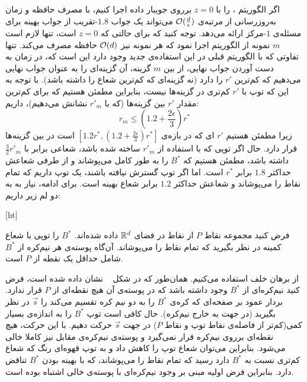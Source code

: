 اگر الگوریتم ، را با $z=0$ برروی جویبار داده اجرا کنیم، با مصرف حافظه‌ و زمان به‌روزرسانی از مرتبه‌ی $\mathcal{O}(\frac{d}{\epsilon})$ می‌تواند یک جواب $1.8$-تقریب از جواب بهینه برای مسئله‌ی $1$-مرکز ارائه می‌دهد. توجه کنید که برای حالتی که $z=0$ است، تنها لازم است $m$ نمونه از الگوریتم اجرا نمود که هر نمونه نیز $\mathcal{O}(d)$ حافظه مصرف می‌کند. تنها تفاوتی که با الگوریتم قبلی در این استفاده‌ی جدید وجود دارد این است که، در زمان به‌ دست آوردن جواب نهایی، از بین $m$ گزینه، آن گزینه‌ای را به عنوان جواب نهایی می‌دهیم که کم‌ترین $r'$ را دارد (نه گزینه‌ای که کم‌ترین  شعاع را داشته باشد). با توجه به این که توپ با $r'$ کم‌تری در گزینه‌ها نیست، بنابراین مطمئن هستیم که برای کم‌ترین مقدار $r'$ بین گزینه‌ها (که با $r'_m$ نشانش می‌دهیم)، داریم:
$$r_m \leq (1.2 + \frac{2\epsilon}{3})r^*$$
زیرا مطمئن هستیم $r'$ ای که در بازه‌ی $[1.2r^*, (1.2 + \frac{2\epsilon}{3})r^*]$ است در بین گزینه‌ها قرار دارد. حال اگر توپی که با استفاده از $r'_m$ ساخته شده باشد، شعاعی برابر با $\frac{3}{2}r'_m$ داشته باشد، مطمئن هستیم که $B^*$ را به طور کامل می‌پوشاند و از طرفی شعاعش حداکثر $1.8$ برابر $r^*$ است. اما اگر توپ گسترش نیافته باشند، یک توپ داریم که تمام نقاط را می‌پوشاند و شعاعش حداکثر $1.2$ برابر شعاع بهینه است. برای ادامه‌، نیاز به به دو لم زیر داریم:


[ht]


فرض کنید مجموعه نقاط $P$ از نقاط در فضای $\mathbb{R}^d$ داده شده‌اند. $B^*$ را توپی با شعاع کمینه در نظر بگیرید که تمام نقاط را می‌پوشاند. آن‌گاه پوسته‌ی هر نیم‌‌کره از $B^*$ شامل حداقل یک نقطه از $P$ است.


از برهان خلف استفاده می‌کنیم. همان‌طور که در شکل ~ نشان داده شده است، فرض کنید نیم‌کره‌ای از $B^*$ وجود داشته باشد که در پوسته‌ی آن هیچ نقطه‌ای از‌ $P$ قرار ندارد. بردار عمود بر صفحه‌ای که کره‌ی $B^*$ را به دو نیم کره تقسیم می‌کند را $\vec{s}$ در نظر بگیرید (در جهت به خارج نیم‌کره). حال کافی است توپ $B^*$ را به اندازه‌ی بسیار کمی(کم‌تر از فاصله‌ی نقاط توپ و نقاط $P$) در جهت $\vec{s}$ حرکت دهیم. با این حرکت، هیچ نقطه‌ای برروی نیم‌کره قرار نمی‌گیرد و پوسته‌ی نیم‌کره‌ی مقابل نیز کاملا خالی می‌شود. بنابراین می‌توان شعاع توپ را کاهش داد و به توپ قهوه‌ای رنگ که شعاع کم‌تری نسبت به $B^*$ دارد رسید که تمام نقاط را می‌پوشاند، که با بهینه بودن $B^*$ تناقض دارد. بنابراین فرض اولیه مبنی بر وجود نیم‌کره‌ای با پوسته‌ی خالی اشتباه بوده است.

